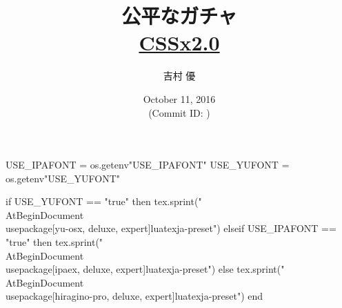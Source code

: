 \hypersetup{colorlinks,linkcolor=,urlcolor=links}

\beamertemplatenavigationsymbolsempty


\usepackage{luacode}
\usepackage{luatexja}
\usepackage{pgfpages}
\usepackage[osf]{mathpazo}

\begin{luacode*}
  USE_IPAFONT = os.getenv"USE_IPAFONT"
  USE_YUFONT = os.getenv"USE_YUFONT"
  
  if USE_YUFONT == "true" then
    tex.sprint("\\AtBeginDocument{\\usepackage[yu-osx, deluxe, expert]{luatexja-preset}}")
  elseif USE_IPAFONT == "true" then
    tex.sprint("\\AtBeginDocument{\\usepackage[ipaex, deluxe, expert]{luatexja-preset}}")
  else
    tex.sprint("\\AtBeginDocument{\\usepackage[hiragino-pro, deluxe, expert]{luatexja-preset}}")
  end
\end{luacode*}

\usepackage{epigraph}
\usepackage{etoolbox}
\usepackage{tikz}
\usepackage{framed}
\usepackage{libertine}
\usepackage{amsmath}
\usepackage{mathtools}

\renewcommand{\kanjifamilydefault}{\gtdefault}


\setmainfont[Numbers=OldStyle, BoldFont=Palatino Bold]{Palatino}
\setsansfont{CMU Sans Serif}
\setmonofont{CMU Typewriter Text}



\title[公平なガチャ]{%
  公平なガチャ \\
  {\normalsize \href{http://www.iwsec.org/css/2016/css2.htm}{CSSx2.0}}
}
\author{吉村 優}
\date[October 11, 2016]{%
  October 11, 2016 \\%
  {\footnotesize (Commit ID: \GITAbrHash)}
}





